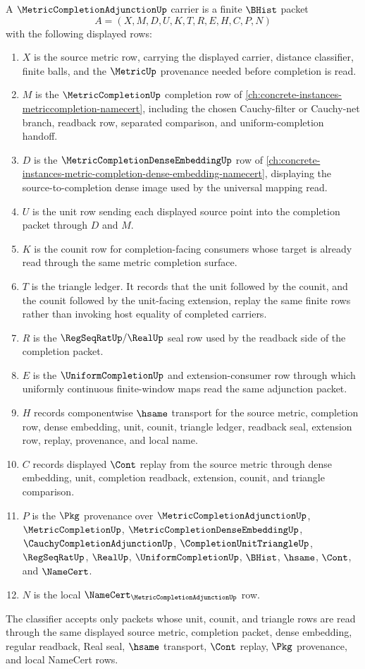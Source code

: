 \begin{definition}
\label{def:metric-completion-adjunction-carrier}
A $\MetricCompletionAdjunctionUp$ carrier is a finite $\BHist$ packet
$$
A=(X,M,D,U,K,T,R,E,H,C,P,N)
$$
with the following displayed rows:
\begin{enumerate}
\item $X$ is the source metric row, carrying the displayed carrier, distance classifier, finite balls, and the $\MetricUp$ provenance needed before completion is read.
\item $M$ is the $\MetricCompletionUp$ completion row of \autoref{ch:concrete-instances-metriccompletion-namecert}, including the chosen Cauchy-filter or Cauchy-net branch, readback row, separated comparison, and uniform-completion handoff.
\item $D$ is the $\MetricCompletionDenseEmbeddingUp$ row of \autoref{ch:concrete-instances-metric-completion-dense-embedding-namecert}, displaying the source-to-completion dense image used by the universal mapping read.
\item $U$ is the unit row sending each displayed source point into the completion packet through $D$ and $M$.
\item $K$ is the counit row for completion-facing consumers whose target is already read through the same metric completion surface.
\item $T$ is the triangle ledger. It records that the unit followed by the counit, and the counit followed by the unit-facing extension, replay the same finite rows rather than invoking host equality of completed carriers.
\item $R$ is the $\RegSeqRatUp/\RealUp$ seal row used by the readback side of the completion packet.
\item $E$ is the $\UniformCompletionUp$ and extension-consumer row through which uniformly continuous finite-window maps read the same adjunction packet.
\item $H$ records componentwise $\hsame$ transport for the source metric, completion row, dense embedding, unit, counit, triangle ledger, readback seal, extension row, replay, provenance, and local name.
\item $C$ records displayed $\Cont$ replay from the source metric through dense embedding, unit, completion readback, extension, counit, and triangle comparison.
\item $P$ is the $\Pkg$ provenance over $\MetricCompletionAdjunctionUp$, $\MetricCompletionUp$, $\MetricCompletionDenseEmbeddingUp$, $\CauchyCompletionAdjunctionUp$, $\CompletionUnitTriangleUp$, $\RegSeqRatUp$, $\RealUp$, $\UniformCompletionUp$, $\BHist$, $\hsame$, $\Cont$, and $\NameCert$.
\item $N$ is the local $\NameCert_{\MetricCompletionAdjunctionUp}$ row.
\end{enumerate}
The classifier accepts only packets whose unit, counit, and triangle rows are read through the same displayed source metric, completion packet, dense embedding, regular readback, Real seal, $\hsame$ transport, $\Cont$ replay, $\Pkg$ provenance, and local NameCert rows.
\end{definition}

